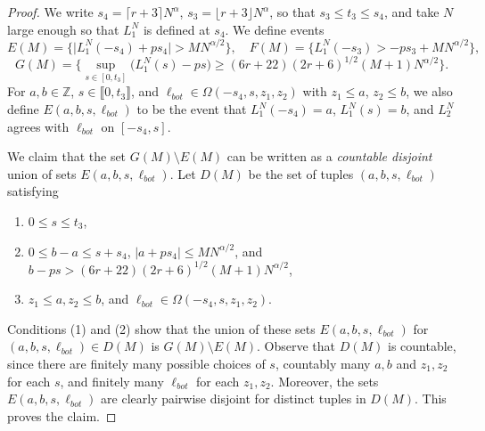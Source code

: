 \documentclass[12pt]{article}
\begin{document}
	\begin{proof}
		We write $s_4 = \lceil r+3 \rceil N^\alpha$, $s_3 = \lfloor r+3 \rfloor N^\alpha$, so that $s_3 \leq t_3 \leq s_4$, and take $N$ large enough so that $L_1^N$ is defined at $s_4$. We define events 
		\[
		E(M) = \Big\{\big|L_1^N(-s_4) + ps_4\big| > MN^{\alpha/2}\Big\}, \quad F(M) = \Big\{L_1^N(-s_3) > -ps_3 + MN^{\alpha/2} \Big\},
		\]
		\[
		G(M) = \Bigg\{\sup_{s\in[0,t_3]} \big(L_1^N(s) - ps \big) \geq (6r+22)(2r+6)^{1/2}(M+1)N^{\alpha/2} \Bigg\}.
		\]
		For $a,b\in\mathbb{Z}$, $s\in\llbracket 0, t_3 \rrbracket$, and $\ell_{bot}\in\Omega(-s_4,s,z_1,z_2)$ with $z_1\leq a$, $z_2\leq b$, we also define $E(a,b,s,\ell_{bot})$ to be the event that $L_1^N(-s_4) = a$, $L_1^N(s) = b$, and $L_2^N$ agrees with $\ell_{bot}$ on $[-s_4,s]$. 
		
		We claim that the set $G(M) \setminus E(M)$ can be written as a \textit{countable disjoint} union of sets $E(a,b,s,\ell_{bot})$. Let $D(M)$ be the set of tuples $(a,b,s,\ell_{bot})$ satisfying
		\begin{enumerate}[label=(\arabic*)]
			
			\item $0\leq s\leq t_3$,
			
			\item $0\leq b-a \leq s + s_4$, $|a + ps_4| \leq MN^{\alpha/2}$, and $b-ps > (6r+22)(2r+6)^{1/2}(M+1)N^{\alpha/2}$,
			
			\item $z_1\leq a, z_2\leq b$, and $\ell_{bot}\in\Omega(-s_4, s, z_1, z_2)$.
			
		\end{enumerate}
		Conditions (1) and (2) show that the union of these sets $E(a,b,s,\ell_{bot})$ for $(a,b,s,\ell_{bot})\in D(M)$ is $G(M)\setminus E(M)$. Observe that $D(M)$ is countable, since there are finitely many possible choices of $s$, countably many $a,b$ and $z_1,z_2$ for each $s$, and finitely many $\ell_{bot}$ for each $z_1,z_2$. Moreover, the sets $E(a,b,s,\ell_{bot})$ are clearly pairwise disjoint for distinct tuples in $D(M)$. This proves the claim.
		

\end{proof}
\end{document}
